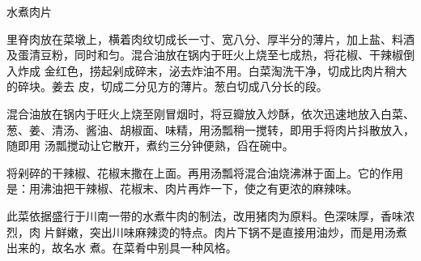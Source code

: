 \begin{recipe}{水煮肉片}

\ingredients


\cooking

\step 里脊肉放在菜墩上，横着肉纹切成长一寸、宽八分、厚半分的薄片，加上盐、料酒
及蛋清豆粉，同时和匀。混合油放在锅内于旺火上烧至七成热，将花椒、干辣椒倒入炸成
金红色，捞起剁成碎末，泌去炸油不用。白菜淘洗干净，切成比肉片稍大的碎块。姜去
皮，切成二分见方的薄片。葱白切成八分长的段。

\step 混合油放在锅内于旺火上烧至刚冒烟时，将豆瓣放入炒酥，依次迅速地放入白菜、
葱、姜、清汤、酱油、胡椒面、味精，用汤瓢稍一搅转，即用手将肉片抖散放入，随即用
汤瓢搅动让它散开，煮约三分钟便熟，舀在碗中。

\step 将剁碎的干辣椒、花椒末撒在上面。再用汤瓢将混合油烧沸淋于面上。它的作用
是：用沸油把干辣椒、花椒末、肉片再炸一下，使之有更浓的麻辣味。

\features

此菜依据盛行于川南一带的水煮牛肉的制法，改用猪肉为原料。色深味厚，香味浓烈，肉
片鲜嫩，突出川味麻辣烫的特点。肉片下锅不是直接用油炒，而是用汤煮出来的，故名水
煮。在菜肴中别具一种风格。

\end{recipe}

